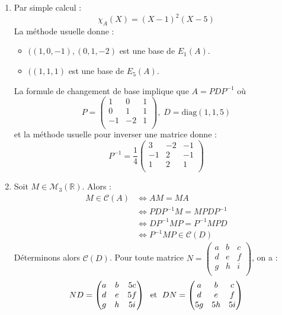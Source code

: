 \documentclass[a4paper,10pt]{report}
\begin{document}
\begin{enumerate}
\item Par simple calcul :
$$ \chi_A(X)= (X-1)^2 (X-5)$$
La méthode usuelle donne :
\begin{itemize}
\item $((1,0,-1),(0,1,-2)$ est une base de $E_1(A)$.
\item $((1,1,1)$ est une base de $E_5(A)$.
\end{itemize}
La formule de changement de base implique que $A=PDP^{-1}$ où 
$$ P = \begin{pmatrix}
1& 0 & 1 \\
0& 1 & 1 \\
-1 & -2 & 1 \\
\end{pmatrix}, \; D= \textrm{diag}(1,1,5)$$
et la méthode usuelle pour inverser une matrice donne :
$$ P^{-1} = \dfrac{1}{4} \begin{pmatrix}
3 & -2 & -1 \\
-1 & 2 & -1 \\
1 & 2 & 1 \\
\end{pmatrix}$$
\item Soit $M \in \mathcal{M}_3(\mathbb{R})$. Alors :
\begin{align*}
M \in \mathcal{C}(A) & \Longleftrightarrow AM=MA \\
& \Longleftrightarrow PDP^{-1} M = M PDP^{-1} \\
& \Longleftrightarrow DP^{-1}MP = P^{-1}MPD  \\
& \Longleftrightarrow P^{-1}MP \in \mathcal{C}(D)
\end{align*}
Déterminons alors $\mathcal{C}(D)$. Pour toute matrice $N = \begin{pmatrix}
a & b & c \\
d & e & f \\
g & h & i \\
\end{pmatrix}$, on a :
$$ ND = \begin{pmatrix}
a & b & 5c \\
d & e & 5f \\
g & h & 5i \\
\end{pmatrix} \; \hbox{ et } \; DN = \begin{pmatrix}
a & b & c \\
d & e & f \\
5g & 5h & 5i \\
\end{pmatrix}$$

\end{enumerate}
\end{document}

